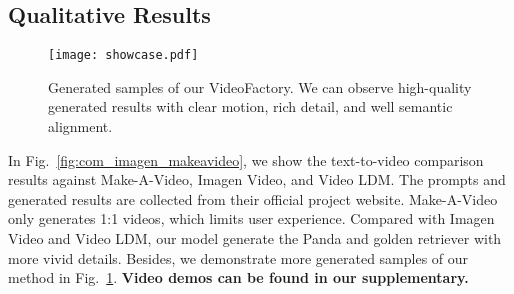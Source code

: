 \documentclass{article}
\begin{document}
\begin{table}[t]
\centering
\caption{User Preference. The number indicates the percentage of humans that prefer our method over the compared method. We also show the ratio of the network parameter v.s. Ours.}
\vspace{1mm}
\renewcommand{\arraystretch}{1.2}
\label{tab:user_study}
\end{table}




\subsection{Qualitative Results}
\begin{figure}[t]
    \centering
    \texttt{[image: showcase.pdf]}
    \caption{Generated samples of our VideoFactory. We can observe high-quality generated results with clear motion, rich detail, and well semantic alignment.}
    \label{fig:showcase_our}
    \vspace{-5mm}
\end{figure}

In Fig.~\ref{fig:com_imagen_makeavideo}, we show the text-to-video comparison results against Make-A-Video, Imagen Video, and Video LDM.
The prompts and generated results are collected from their official project website.
Make-A-Video only generates 1:1 videos, which limits user experience.
Compared with Imagen Video and Video LDM, our model generate the Panda and golden retriever with more vivid details.
Besides, we demonstrate more generated samples of our method in Fig.~\ref{fig:showcase_our}.
\textbf{Video demos can be found in our supplementary.}
\end{document}
